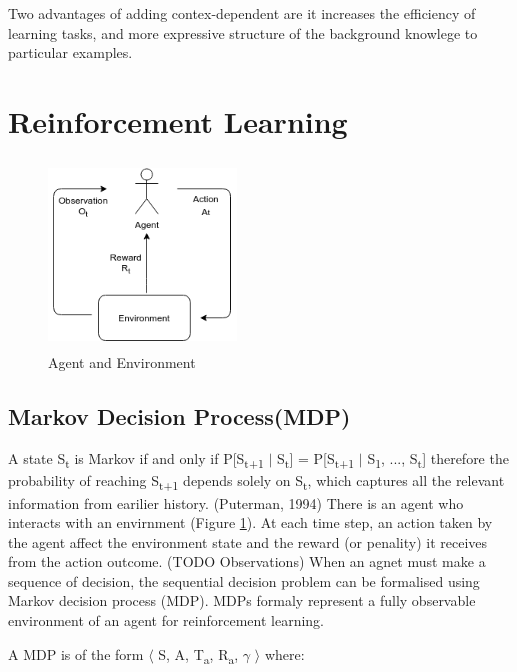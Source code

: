 \documentclass[12pt,twoside]{report}
\begin{document}
Two advantages of adding contex-dependent are it increases the efficiency of learning tasks, and more expressive structure of the background knowlege to particular examples.


\section{Reinforcement Learning}
\label{rl}

\begin{figure}[!htb]
\centering
\includegraphics[width=5cm, height=5cm]{./figures/agent_env}
\caption{Agent and Environment}
\label{agent_env}
\end{figure}


\subsection{Markov Decision Process(MDP)}

A state S\textsubscript{t} is Markov if and only if
P[S\textsubscript{t+1} $\vert$ S\textsubscript{t}] = P[S\textsubscript{t+1} $\vert$ S\textsubscript{1}, ..., S\textsubscript{t}] therefore the probability of reaching S\textsubscript{t+1} depends solely on S\textsubscript{t}, which captures all the relevant information from earilier history.
(Puterman, 1994)
There is an agent who interacts with an envirnment (Figure \ref{agent_env}). At each time step, an action taken by the agent affect the environment state and the reward (or penality) it receives from the action outcome. (TODO Observations)
When an agnet must make a sequence of decision, the sequential decision problem can be formalised using Markov decision process (MDP). MDPs formaly represent a fully observable environment of an agent for reinforcement learning.

A MDP is of the form $\langle$ S, A, T\textsubscript{a}, R\textsubscript{a}, $\gamma$ $\rangle$ where: \\
\end{document}
